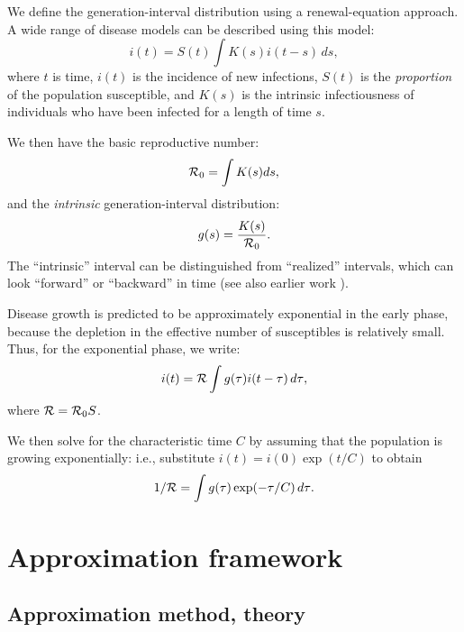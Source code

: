 \documentclass[12pt,]{article}
\newcommand{\RR}{\ensuremath{{\cal R}}}
\newcommand{\Rx}[1]{\ensuremath{{\cal R}_{#1}}}
\newcommand{\Ro}{\Rx{0}}
\newcommand{\Tc}{\ensuremath{C}}
\begin{document}
We define the generation-interval distribution using a renewal-equation approach.
A wide range of disease models can be described using this model: 
\begin{equation}
i(t) = S(t)\int{K(s)i(t-s) \,ds},
\label{eq:Renewal}
\end{equation}
where $t$ is time, $i(t)$ is the incidence of new infections, $S(t)$ is the \emph{proportion} of the population susceptible, and $K(s)$ is the intrinsic infectiousness of individuals who have been infected for a length of time $s$.

We then have the basic reproductive number: 
\begin{equation}
\Ro = \int{K(s)ds},
\end{equation}
and the \emph{intrinsic} generation-interval distribution:
\begin{equation}
g(s) = \frac{K(s)}{\Ro}.
\end{equation}
The ``intrinsic'' interval can be distinguished from ``realized'' intervals, which can look ``forward'' or ``backward'' in time \cite{ChamDush15} (see also earlier work \cite{Sven07,Nish10}).

Disease growth is predicted to be approximately exponential in the early phase, because the depletion in the effective number of susceptibles is relatively small.
Thus, for the exponential phase, we write:
\begin{equation}
i(t) = \RR\int{g(\tau)i(t-\tau) \,d\tau},
\end{equation}
where $\RR = \Ro S$.

We then solve for the characteristic time $\Tc$ by assuming that the population is growing exponentially: i.e., substitute $i(t) = i(0) \exp(t/\Tc)$ to obtain
\begin{equation}
	1/\RR = \int{g(\tau)\exp(-\tau/\Tc) \,d\tau}.\label{eq:Euler}
\end{equation}

\section{Approximation framework}

\subsection{Approximation method, theory}
\end{document}
